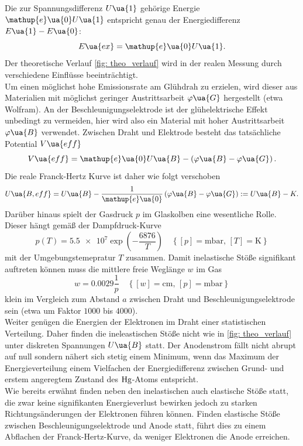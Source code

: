 Die zur Spannungsdifferenz $U\ua{1}$ gehörige
Energie $\mathup{e}\ua{0}U\ua{1}$ entspricht genau der Energiedifferenz $E\ua{1} - E\ua{0}$:
\begin{equation}
  \label{eq: anregungsenergie}
  E\ua{ex} = \mathup{e}\ua{0}U\ua{1}.
\end{equation}
Der theoretische
Verlauf \ref{fig: theo_verlauf} wird in der realen Messung durch verschiedene Einflüsse beeinträchtigt. \\
Um einen möglichst hohe Emissionsrate am Glühdrah zu erzielen, wird dieser aus Materialien mit möglichst geringer Austrittsarbeit $\varphi\ua{G}$
hergestellt (etwa Wolfram). An der Beschleunigungselektrode ist der glühelektrische Effekt unbedingt zu vermeiden, hier wird also
ein Material mit hoher Austrittsarbeit $\varphi\ua{B}$ verwendet. Zwischen Draht und Elektrode besteht das tatsächliche
Potential $V\ua{eff}$
\begin{equation}
  V\ua{eff} = \mathup{e}\ua{0} U\ua{B} - \left(\varphi\ua{B} - \varphi\ua{G}  \right).
\end{equation}
Die reale Franck-Hertz Kurve ist daher wie folgt verschoben
\begin{equation}
  \label{eq: effektivspannung}
  U\ua{B, eff} = U\ua{B} - \frac{1}{\mathup{e}\ua{0}}\left(\varphi\ua{B} - \varphi\ua{G}  \right) := U\ua{B}  - K.
\end{equation}
Darüber hinaus spielt der Gasdruck $p$ im Glaskolben eine wesentliche Rolle. Dieser hängt gemäß der Dampfdruck-Kurve
\begin{equation}
  \label{eq: dampfdruck}
  p(T) = \num{5.5e7}\exp \left( -\frac{6876}{T} \right) \quad \left\{[p] = \si{\milli\bar}, \, [T] = \si{\kelvin}\right\}
\end{equation}
mit der Umgebungstemepratur $T$ zusammen. Damit inelastische Stöße signifikant auftreten können muss die mittlere
freie Weglänge $w$ im Gas
\begin{equation}
  \label{eq: weglaenge}
  w = 0.0029 \frac{1}{p} \quad \left\{[w] = \si{\centi\meter}, \, [p] = \si{\milli\bar} \right\}
\end{equation}
klein im Vergleich zum Abstand $a$ zwischen Draht und Beschleunigungselektrode sein (etwa um Faktor $1000$ bis $4000$). \\
Weiter genügen die Energien der Elektronen im Draht einer statistischen Verteilung. Daher finden die ineleastischen
Stöße nicht wie in \ref{fig: theo_verlauf} unter diskreten Spannungen $U\ua{B}$ statt. Der Anodenstrom fällt nicht abrupt
auf null sondern nähert sich stetig einem Minimum, wenn das Maximum der Energieverteilung einem Vielfachen der Energiedifferenz
zwischen Grund- und erstem angeregtem Zustand des $\ce{Hg}$-Atoms entspricht. \\
Wie bereits erwähnt finden neben den inelastischen auch elastische Stöße statt, die zwar keine signifikanten Energieverlust
bewirken jedoch zu starken Richtungsänderungen der Elektronen führen können. Finden elastische Stöße zwischen Beschleunigungselektrode
und Anode statt, führt dies zu einem Abflachen der Franck-Hertz-Kurve, da weniger Elektronen die Anode erreichen.
